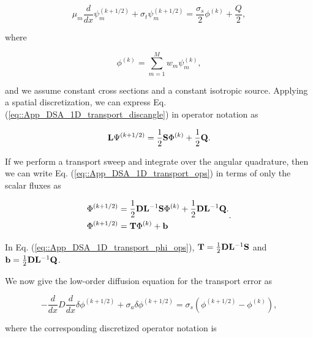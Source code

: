 \begin{equation}
\label{eq::App_DSA_1D_transport_discangle}
\mu_m \frac{d }{d x} \psi_m^{(k+1/2)} + \sigma_t \psi_m^{(k+1/2)} = \frac{\sigma_s }{2} \phi^{(k)}  + \frac{Q}{2},
\end{equation}

\noindent where

\begin{equation}
\label{eq::App_DSA_1D_angint}
\phi^{(k)} = \sum_{m=1}^M w_m \psi_m^{(k)},
\end{equation}

\noindent and we assume constant cross sections and a constant isotropic source. Applying a spatial discretization, we can express Eq. (\ref{eq::App_DSA_1D_transport_discangle}) in operator notation as 

\begin{equation}
\label{eq::App_DSA_1D_transport_ops}
{\bf L} \Psi^{(k+1/2)} = \frac{1}{2} {\bf S} \Phi^{(k)}  + \frac{1}{2} {\bf Q}.
\end{equation}

\noindent If we perform a transport sweep and integrate over the angular quadrature, then we can write Eq. (\ref{eq::App_DSA_1D_transport_ops}) in terms of only the scalar fluxes as

\begin{equation}
\label{eq::App_DSA_1D_transport_phi_ops}
\begin{aligned}
 \Phi^{(k+1/2)} &= \frac{1}{2} {\bf D} {\bf L}^{-1} {\bf S} \Phi^{(k)}  + \frac{1}{2} {\bf D} {\bf L}^{-1} {\bf Q}. \\
 \Phi^{(k+1/2)} &= {\bf T}\Phi^{(k)} + {\bf b}
\end{aligned}.
\end{equation}

\noindent In Eq. (\ref{eq::App_DSA_1D_transport_phi_ops}), ${\bf T}=\frac{1}{2} {\bf D} {\bf L}^{-1} {\bf S}$ and ${\bf b} = \frac{1}{2} {\bf D} {\bf L}^{-1} {\bf Q}$.

We now give the low-order diffusion equation for the transport error as 

\begin{equation}
\label{eq::App_DSA_1D_diff_eq}
- \frac{d}{dx} D \frac{d }{dx} \delta \phi^{(k+1/2)}+ \sigma_a \delta \phi^{(k+1/2)} = \sigma_s \left(  \phi^{(k+1/2)} - \phi^{(k)} \right) ,
\end{equation}

\noindent where the corresponding discretized operator notation is

